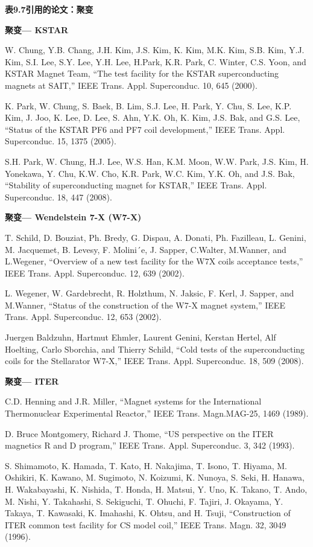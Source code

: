 \noindent \textbf{表9.7引用的论文：聚变}

\noindent \textbf{聚变--- KSTAR }

\noindent [9.36] W. Chung, Y.B. Chang, J.H. Kim, J.S. Kim, K. Kim, M.K. Kim, S.B. Kim,
Y.J. Kim, S.I. Lee, S.Y. Lee, Y.H. Lee, H.Park, K.R. Park, C. Winter, C.S. Yoon,
and KSTAR Magnet Team, ``The test facility for the KSTAR superconducting
magnets at SAIT,” IEEE Trans. Appl. Superconduc. 10, 645 (2000).

\noindent [9.37] K. Park, W. Chung, S. Baek, B. Lim, S.J. Lee, H. Park, Y. Chu, S. Lee, K.P. Kim,
J. Joo, K. Lee, D. Lee, S. Ahn, Y.K. Oh, K. Kim, J.S. Bak, and G.S. Lee, ``Status
of the KSTAR PF6 and PF7 coil development,” IEEE Trans. Appl. Superconduc.
15, 1375 (2005).

\noindent [9.38] S.H. Park, W. Chung, H.J. Lee, W.S. Han, K.M. Moon, W.W. Park, J.S. Kim,
H. Yonekawa, Y. Chu, K.W. Cho, K.R. Park, W.C. Kim, Y.K. Oh, and J.S. Bak,
``Stability of superconducting magnet for KSTAR,” IEEE Trans. Appl. Superconduc.
18, 447 (2008).

\noindent \textbf{聚变--- Wendelstein 7-X (W7-X) }

\noindent [9.39] T. Schild, D. Bouziat, Ph. Bredy, G. Dispau, A. Donati, Ph. Fazilleau, L. Genini,
M. Jacquemet, B. Levesy, F. Molini´e, J. Sapper, C.Walter, M.Wanner, and L.Wegener,
``Overview of a new test facility for the W7X coils acceptance tests,” IEEE
Trans. Appl. Superconduc. 12, 639 (2002).

\noindent [9.40] L. Wegener, W. Gardebrecht, R. Holzthum, N. Jaksic, F. Kerl, J. Sapper, and
M.Wanner, ``Status of the construction of the W7-X magnet system,” IEEE Trans.
Appl. Superconduc. 12, 653 (2002).

\noindent [9.41] Juergen Baldzuhn, Hartmut Ehmler, Laurent Genini, Kerstan Hertel, Alf Hoelting,
Carlo Sborchia, and Thierry Schild, ``Cold tests of the superconducting coils for
the Stellarator W7-X,” IEEE Trans. Appl. Superconduc. 18, 509 (2008).

\noindent \textbf{聚变--- ITER }

\noindent [9.42] C.D. Henning and J.R. Miller, ``Magnet systems for the International Thermonuclear Experimental Reactor,” IEEE Trans. Magn.MAG-25, 1469 (1989).

\noindent [9.43] D. Bruce Montgomery, Richard J. Thome, ``US perspective on the ITER magnetics R and D program,” IEEE Trans. Appl. Superconduc. 3, 342 (1993).

\noindent [9.44] S. Shimamoto, K. Hamada, T. Kato, H. Nakajima, T. Isono, T. Hiyama, M. Oshikiri,
K. Kawano, M. Sugimoto, N. Koizumi, K. Nunoya, S. Seki, H. Hanawa,
H. Wakabayashi, K. Nishida, T. Honda, H. Matsui, Y. Uno, K. Takano, T. Ando,
M. Nishi, Y. Takahashi, S. Sekiguchi, T. Ohuchi, F. Tajiri, J. Okayama, Y. Takaya,
T. Kawasaki, K. Imahashi, K. Ohtsu, and H. Tsuji, ``Construction of ITER common
test facility for CS model coil,” IEEE Trans. Magn. 32, 3049 (1996).

